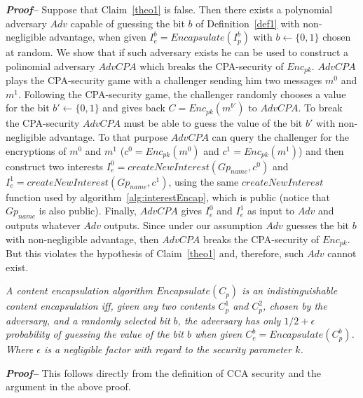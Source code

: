 \textit{\textbf{Proof--}} Suppose that Claim~\ref{theo1} is false. Then there exists a polynomial adversary $Adv$ capable of guessing the bit $b$ of Definition~\ref{def1} with non-negligible advantage, when given $I_e^b = Encapsulate(I_p^b)$ with $b \leftarrow \{0,1\}$ chosen at random. We show that if such adversary exists he can be used to construct a polinomial adversary $AdvCPA$ which breaks the CPA-security of $Enc_{pk}$. $AdvCPA$ plays the CPA-security game with a challenger sending him two messages $m^0$ and $m^1$. Following the CPA-security game, the challenger randomly chooses a value for the bit $b' \leftarrow \{0,1\}$ and gives back $C = Enc_{pk}(m^{b'})$ to $AdvCPA$. To break the CPA-security $AdvCPA$ must be able to guess the value of the bit $b'$ with non-negligible advantage. To that purpose $AdvCPA$ can query the challenger for the encryptions of $m^0$ and $m^1$ ($c^0 = Enc_{pk}(m^0)$ and $c^1 = Enc_{pk}(m^1)$) and then construct two interests $I_e^0 = createNewInterest(Gp_{name}, c^0)$ and $I_e^1 = createNewInterest(Gp_{name}, c^1)$, using the same $createNewInterest$ function used by algorithm~\ref{alg:interestEncap}, which is public (notice that $Gp_{name}$ is also public). Finally, $AdvCPA$ gives $I_e^0$ and $I_e^1$ as input to $Adv$ and outputs whatever $Adv$ outputs. Since under our assumption $Adv$ guesses the bit $b$ with non-negligible advantage, then $AdvCPA$ breaks the CPA-security of $Enc_{pk}$. But this violates the hypothesis of Claim~\ref{theo1} and, therefore, such $Adv$ cannot exist.

\begin{definition}
\textit{
A content encapsulation algorithm $Encapsulate(C_p)$ is an indistinguishable content encapsulation iff, given any two contents $C_p^1$ and $C_p^2$, chosen by the adversary, and a randomly selected bit $b$, the adversary has only $1/2 + \epsilon$ probability of guessing the value of the bit $b$ when given $C_e^b = Encapsulate(C_p^b)$. Where $\epsilon$ is a negligible factor with regard to the security parameter $k$.
}
\end{definition}


\textit{\textbf{Proof--}} This follows directly from the definition of CCA security and the
argument in the above proof.

